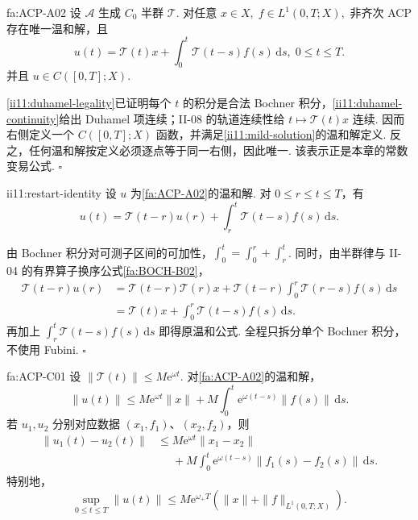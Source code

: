 \begin{FATheorem}[A][温和解与常数变易公式]{fa:ACP-A02}
设 \(\displaystyle\mathcal A\) 生成 \(\displaystyle C_0\) 半群 \(\displaystyle\mathcal T\). 对任意 \(\displaystyle x\in X, \; f\in L^1(0,T;X),\)
非齐次 ACP 存在唯一温和解，且
\[
u(t)
=
\mathcal T(t)x
+
\int_0^t\mathcal T(t-s)f(s)\,\mathrm{d}s,
\;
0\leqslant t\leqslant T.
\]
并且 \(\displaystyle u\in C([0,T];X)\).
\end{FATheorem}

\begin{FAProof}
\autoref{ii11:duhamel-legality}已证明每个 \(\displaystyle t\) 的积分是合法 Bochner 积分，\autoref{ii11:duhamel-continuity}给出 Duhamel 项连续；II-08 的轨道连续性给 \(\displaystyle t\mapsto\mathcal T(t)x\) 连续. 因而右侧定义一个 \(\displaystyle C([0,T];X)\) 函数，并满足\autoref{ii11:mild-solution}的温和解定义. 反之，任何温和解按定义必须逐点等于同一右侧，因此唯一. 该表示正是本章的常数变易公式.
\hfill\(\square\)
\end{FAProof}

\begin{FAProposition}[B][温和解的重新起步恒等式]{ii11:restart-identity}
设 \(\displaystyle u\) 为\autoref{fa:ACP-A02}的温和解. 对 \(\displaystyle0\leqslant r\leqslant t\leqslant T\)，有
\[
u(t)
=
\mathcal T(t-r)u(r)
+
\int_r^t\mathcal T(t-s)f(s)\,\mathrm{d}s.
\]
\end{FAProposition}

\begin{FAProof}
由 Bochner 积分对可测子区间的可加性，\(\displaystyle \int_0^t=\int_0^r+\int_r^t\). 同时，由半群律与 II-04 的有界算子换序公式\autoref{fa:BOCH-B02}，
\[
\begin{aligned}
\mathcal T(t-r)u(r)
&=
\mathcal T(t-r)\mathcal T(r)x
+
\mathcal T(t-r)\int_0^r\mathcal T(r-s)f(s)\,\mathrm{d}s\\
&=
\mathcal T(t)x
+
\int_0^r\mathcal T(t-s)f(s)\,\mathrm{d}s.
\end{aligned}
\]
再加上 \(\displaystyle\int_r^t\mathcal T(t-s)f(s)\,\mathrm{d}s\) 即得原温和公式. 全程只拆分单个 Bochner 积分，不使用 Fubini.
\hfill\(\square\)
\end{FAProof}

\begin{FAProposition}[C][温和解的估计与数据稳定性]{fa:ACP-C01}
设 \(\displaystyle\|\mathcal T(t)\|\leqslant M\mathrm{e}^{\omega t}\). 对\autoref{fa:ACP-A02}的温和解，
\[
\|u(t)\|
\leqslant
M\mathrm{e}^{\omega t}\|x\|
+
M\int_0^t\mathrm{e}^{\omega(t-s)}\|f(s)\|\,\mathrm{d}s.
\]
若 \(\displaystyle u_1,u_2\) 分别对应数据 \(\displaystyle(x_1,f_1)\)、\(\displaystyle(x_2,f_2)\)，则
\[
\begin{aligned}
\|u_1(t)-u_2(t)\|
&\leqslant
M\mathrm{e}^{\omega t}\|x_1-x_2\|\\
&\mathrel{\phantom{\leqslant}}+
M\int_0^t\mathrm{e}^{\omega(t-s)}\|f_1(s)-f_2(s)\|\,\mathrm{d}s.
\end{aligned}
\]
特别地，
\[
\sup_{0\leqslant t\leqslant T}\|u(t)\|
\leqslant
M\mathrm{e}^{\omega_+T}
\left(
\|x\|+\|f\|_{L^1(0,T;X)}
\right).
\]
\end{FAProposition}

